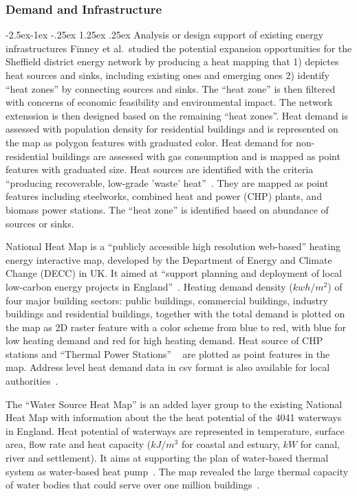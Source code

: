 \documentclass[hidelinks,12pt]{article}
\makeatletter
\renewcommand\paragraph{\@startsection{paragraph}{4}{\z@}%
            {-2.5ex\@plus -1ex \@minus -.25ex}%
            {1.25ex \@plus .25ex}%
            {\normalfont\normalsize\bfseries}}
\makeatother
\begin{document}
\subsubsection{Demand and Infrastructure}
\paragraph{Analysis or design support of existing energy
  infrastructures}
Finney et al.\ studied the potential expansion opportunities for the
Sheffield district energy network by producing a heat mapping that 1)
depictes heat sources and sinks, including existing ones and emerging
ones 2) identify ``heat zones'' by connecting sources and sinks. The
``heat zone'' is then filtered with concerns of economic feasibility
and environmental impact. The network extenssion is then designed
based on the remaining ``heat zones''. Heat demand is assessed with
population density for residential buildings and is represented on the
map as polygon features with graduated color. Heat demand for
non-residential buildings are assessed with gas consumption and is
mapped as point features with graduated size. Heat sources are
identified with the criteria ``producing recoverable, low-grade
'waste' heat''~\cite{Finney2012165}. They are mapped as point features
including steelworks, combined heat and power (CHP) plants, and
biomass power stations. The ``heat zone'' is identified based on
abundance of sources or sinks.

National Heat Map is a ``publicly accessible high resolution
web-based'' heating energy interactive map, developed by the
Department of Energy and Climate Change (DECC) in UK. It aimed at
``support planning and deployment of local low-carbon energy projects
in England''~\cite{heatMap2015}. Heating demand density ($kwh/m^2$) of
four major building sectors: public buildings, commercial buildings,
industry buildings and residential buildings, together with the total
demand is plotted on the map as 2D raster feature with a color scheme
from blue to red, with blue for low heating demand and red for high
heating demand. Heat source of CHP stations and ``Thermal Power
Stations'' ~\cite{heatMap2012} are plotted as point features in the
map. Address level heat demand data in csv format is also available
for local authorities~\cite{heatMapLocal2012}. 

The ``Water Source Heat Map'' is an added layer group to the existing
National Heat Map with information about the the heat potential of the
4041 waterways in England. Heat potential of waterways are represented
in temperature, surface area, flow rate and heat capacity ($kJ/m^3$
for coastal and estuary, $kW$ for canal, river and settlement). It
aims at supporting the plan of water-based thermal system as
water-based heat pump~\cite{waterHeatMap}. The map revealed the large
thermal capacity of water bodies that could serve over one million
buildings~\cite{waterHeatMap}.
\end{document}
